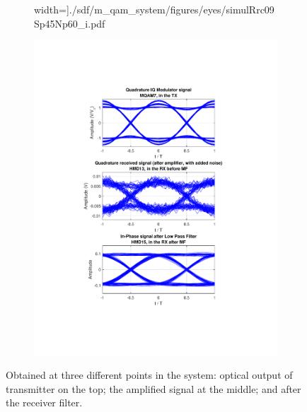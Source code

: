 \begin{refsection}
\begin{figure}[H]
\begin{minipage}{\linewidth}
\begin{subfigure}{.45\textwidth}
			width=\textwidth]{./sdf/m_qam_system/figures/eyes/simulRrc09Sp45Np60_i.pdf}
	\end{subfigure}
	\begin{subfigure}{.45\textwidth}
		\centering
		\includegraphics[clip, trim=4cm 4cm 4cm 4cm, 
		width=\textwidth]{./sdf/m_qam_system/figures/eyes/simulRrc09Sp45Np60_q.pdf}
	\end{subfigure}
	
	\caption{
		Obtained at three different points in the system: optical output of transmitter on the top;
		the amplified signal at the middle; and
		after the receiver filter.
		\label{fig:eyes_n_rrc_45_09}}
	\end{minipage}
\end{figure}



\end{refsection}
